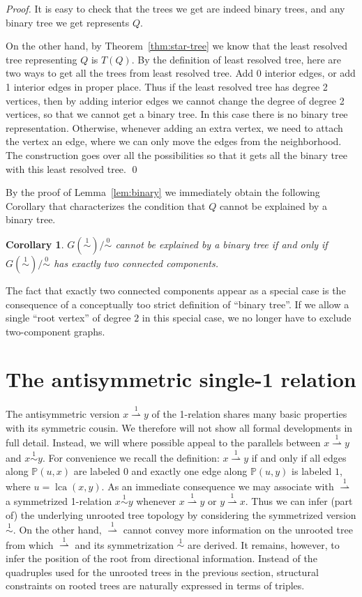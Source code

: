 \documentclass[smallextended]{svjour3}
\newcommand{\Ro}{\mathrel{\overset{0}{\sim}}}
\newcommand{\Rl}{\mathrel{\overset{1}{\sim}}}
\newcommand{\Rld}{\mathrel{\overset{1}{\rightharpoonup}}}
\newcommand{\lca}[1]{\mathop{lca}(#1)}
\newtheorem{cor}[thm]{Corollary}
\begin{document}
\begin{proof}
  It is easy to check that the trees we get are indeed binary trees, and
  any binary tree we get represents $Q$.
 
  On the other hand, by Theorem~\ref{thm:star-tree} we know that the least
  resolved tree representing $Q$ is $T(Q)$.  By the definition of least
  resolved tree, here are two ways to get all the trees from least resolved
  tree. Add 0 interior edges, or add 1 interior edges in proper place.
  Thus if the least resolved tree has degree 2 vertices, then by adding
  interior edges we cannot change the degree of degree 2 vertices, so that
  we cannot get a binary tree.  In this case there is no binary tree
  representation.  Otherwise, whenever adding an extra vertex, we need to
  attach the vertex an edge, where we can only move the edges from the
  neighborhood.  The construction goes over all the possibilities so that
  it gets all the binary tree with this least resolved tree. \qed
\end{proof}

By the proof of Lemma~\ref{lem:binary} we immediately obtain the following
Corollary that characterizes the condition that $Q$ cannot be explained by
a binary tree.
\begin{cor}
  $G(\Rl)/\Ro$ cannot be explained by a binary tree if and only if
  $G(\Rl)/\Ro$ has exactly two connected components.
\end{cor}
The fact that exactly two connected components appear as a special
  case is the consequence of a conceptually too strict definition of
  ``binary tree''. If we allow a single ``root vertex'' of degree $2$ in
  this special case, we no longer have to exclude two-component graphs.

\section{The antisymmetric single-1 relation}
\label{sect:1dir}

The antisymmetric version $x\Rld y$ of the 1-relation shares many basic
properties with its symmetric cousin. We therefore will not show all formal
developments in full detail. Instead, we will where possible appeal to the
parallels between $x\Rld y$ and $x\Rl y$. For convenience we recall the
definition: $x \Rld y$ if and only if all edges along $\mathbb{P}(u,x)$ are
labeled $0$ and exactly one edge along $\mathbb{P}(u,y)$ is labeled $1$,
where $u=\lca{x,y}$. As an immediate consequence we may associate with
$\Rld$ a symmetrized 1-relation $x\Rl y$ whenever $x\Rld y$ or $y\Rld
x$. Thus we can infer (part of) the underlying unrooted tree topology by
considering the symmetrized version $\Rl$. On the other hand, $\Rld$ cannot
convey more information on the unrooted tree from which $\Rld$ and its
symmetrization $\Rl$ are derived. It remains, however, to infer the
position of the root from directional information. Instead of the
quadruples used for the unrooted trees in the previous section, structural
constraints on rooted trees are naturally expressed in terms of triples.
\end{document}
